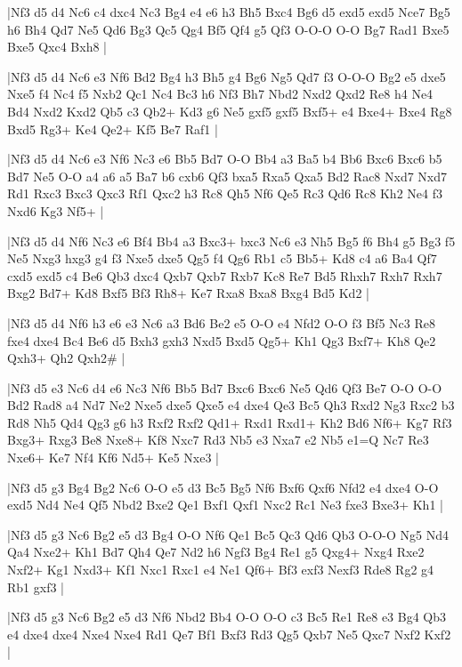 \whitename{}
\blackname{}
\makegametitle
|Nf3 d5 d4 Nc6 c4 dxc4 Nc3 Bg4 e4 e6 h3 Bh5 Bxc4 Bg6 d5 exd5 exd5 Nce7 Bg5 h6 Bh4 Qd7 Ne5 Qd6 Bg3 Qc5 Qg4 Bf5 Qf4 g5 Qf3 O-O-O O-O Bg7 Rad1 Bxe5 Bxe5 Qxc4 Bxh8  |

\whitename{}
\blackname{}
\makegametitle
|Nf3 d5 d4 Nc6 e3 Nf6 Bd2 Bg4 h3 Bh5 g4 Bg6 Ng5 Qd7 f3 O-O-O Bg2 e5 dxe5 Nxe5 f4 Nc4 f5 Nxb2 Qc1 Nc4 Bc3 h6 Nf3 Bh7 Nbd2 Nxd2 Qxd2 Re8 h4 Ne4 Bd4 Nxd2 Kxd2 Qb5 c3 Qb2+ Kd3 g6 Ne5 gxf5 gxf5 Bxf5+ e4 Bxe4+ Bxe4 Rg8 Bxd5 Rg3+ Ke4 Qe2+ Kf5 Be7 Raf1  |

\whitename{}
\blackname{}
\makegametitle
|Nf3 d5 d4 Nc6 e3 Nf6 Nc3 e6 Bb5 Bd7 O-O Bb4 a3 Ba5 b4 Bb6 Bxc6 Bxc6 b5 Bd7 Ne5 O-O a4 a6 a5 Ba7 b6 cxb6 Qf3 bxa5 Rxa5 Qxa5 Bd2 Rac8 Nxd7 Nxd7 Rd1 Rxc3 Bxc3 Qxc3 Rf1 Qxc2 h3 Rc8 Qh5 Nf6 Qe5 Rc3 Qd6 Rc8 Kh2 Ne4 f3 Nxd6 Kg3 Nf5+  |

\whitename{}
\blackname{}
\makegametitle
|Nf3 d5 d4 Nf6 Nc3 e6 Bf4 Bb4 a3 Bxc3+ bxc3 Nc6 e3 Nh5 Bg5 f6 Bh4 g5 Bg3 f5 Ne5 Nxg3 hxg3 g4 f3 Nxe5 dxe5 Qg5 f4 Qg6 Rb1 c5 Bb5+ Kd8 c4 a6 Ba4 Qf7 cxd5 exd5 c4 Be6 Qb3 dxc4 Qxb7 Qxb7 Rxb7 Kc8 Re7 Bd5 Rhxh7 Rxh7 Rxh7 Bxg2 Bd7+ Kd8 Bxf5 Bf3 Rh8+ Ke7 Rxa8 Bxa8 Bxg4 Bd5 Kd2  |

\whitename{}
\blackname{}
\makegametitle
|Nf3 d5 d4 Nf6 h3 e6 e3 Nc6 a3 Bd6 Be2 e5 O-O e4 Nfd2 O-O f3 Bf5 Nc3 Re8 fxe4 dxe4 Bc4 Be6 d5 Bxh3 gxh3 Nxd5 Bxd5 Qg5+ Kh1 Qg3 Bxf7+ Kh8 Qe2 Qxh3+ Qh2 Qxh2\#  |

\whitename{}
\blackname{}
\makegametitle
|Nf3 d5 e3 Nc6 d4 e6 Nc3 Nf6 Bb5 Bd7 Bxc6 Bxc6 Ne5 Qd6 Qf3 Be7 O-O O-O Bd2 Rad8 a4 Nd7 Ne2 Nxe5 dxe5 Qxe5 e4 dxe4 Qe3 Bc5 Qh3 Rxd2 Ng3 Rxc2 b3 Rd8 Nh5 Qd4 Qg3 g6 h3 Rxf2 Rxf2 Qd1+ Rxd1 Rxd1+ Kh2 Bd6 Nf6+ Kg7 Rf3 Bxg3+ Rxg3 Be8 Nxe8+ Kf8 Nxc7 Rd3 Nb5 e3 Nxa7 e2 Nb5 e1=Q Nc7 Re3 Nxe6+ Ke7 Nf4 Kf6 Nd5+ Ke5 Nxe3  |

\whitename{}
\blackname{}
\makegametitle
|Nf3 d5 g3 Bg4 Bg2 Nc6 O-O e5 d3 Bc5 Bg5 Nf6 Bxf6 Qxf6 Nfd2 e4 dxe4 O-O exd5 Nd4 Ne4 Qf5 Nbd2 Bxe2 Qe1 Bxf1 Qxf1 Nxc2 Rc1 Ne3 fxe3 Bxe3+ Kh1  |

\whitename{}
\blackname{}
\makegametitle
|Nf3 d5 g3 Nc6 Bg2 e5 d3 Bg4 O-O Nf6 Qe1 Bc5 Qc3 Qd6 Qb3 O-O-O Ng5 Nd4 Qa4 Nxe2+ Kh1 Bd7 Qh4 Qe7 Nd2 h6 Ngf3 Bg4 Re1 g5 Qxg4+ Nxg4 Rxe2 Nxf2+ Kg1 Nxd3+ Kf1 Nxc1 Rxc1 e4 Ne1 Qf6+ Bf3 exf3 Nexf3 Rde8 Rg2 g4 Rb1 gxf3  |

\whitename{}
\blackname{}
\makegametitle
|Nf3 d5 g3 Nc6 Bg2 e5 d3 Nf6 Nbd2 Bb4 O-O O-O c3 Bc5 Re1 Re8 e3 Bg4 Qb3 e4 dxe4 dxe4 Nxe4 Nxe4 Rd1 Qe7 Bf1 Bxf3 Rd3 Qg5 Qxb7 Ne5 Qxc7 Nxf2 Kxf2  |

